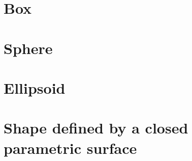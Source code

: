 


\section{Box}


\section{Sphere}


\section{Ellipsoid}


\section{Shape defined by a closed parametric surface}
